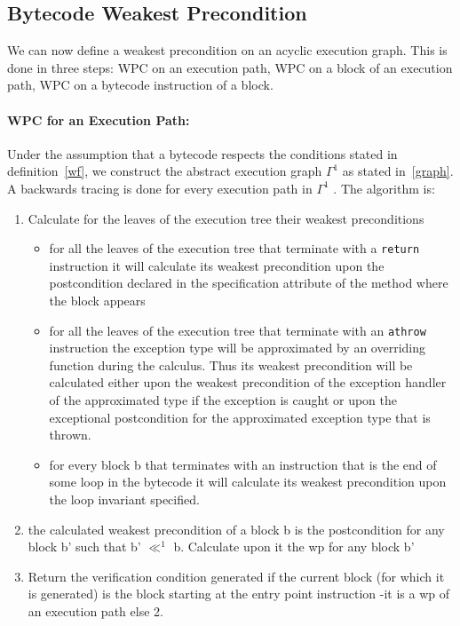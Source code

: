 \subsection{Bytecode Weakest Precondition}
We can now define a weakest precondition on an acyclic execution graph. This is done in three steps: WPC on an execution path, WPC on a block of an execution path, WPC on a bytecode instruction of a block.
\paragraph{WPC for an Execution Path: }
Under the assumption that a bytecode respects the conditions stated in definition~\ref{wf}, we construct the abstract execution graph $\Gamma^1$ as stated in~\ref{graph}. A backwards tracing is done for every execution path in $\Gamma^1$ . The algorithm is:
\begin{enumerate}
\item Calculate for the leaves of the execution tree their weakest preconditions
    \begin{itemize}
    \item for all the leaves of the execution tree that terminate with a \texttt{return} instruction it will calculate its weakest precondition upon the postcondition declared in the specification attribute of the method where the block appears
    \item for all the leaves of the execution tree that terminate with an \texttt{athrow} instruction the exception type will be approximated by an overriding function during the calculus. Thus its weakest precondition will be calculated either upon the weakest precondition of the exception handler of the approximated type if the exception is caught or upon the exceptional postcondition for the approximated exception type that is thrown.
    \item for every block b that terminates with an instruction that is the end of some loop in the bytecode  it will calculate its weakest precondition upon the loop invariant specified.
    \end{itemize}

\item the calculated weakest precondition of a block b is the postcondition  for any block b' such that b' $\ll^1$ b. Calculate upon it the wp for any  block b'
\item Return the verification condition generated if the current block (for which it is generated) is the block starting at the entry point instruction -it is a wp of an execution path else 2.
\end{enumerate}

